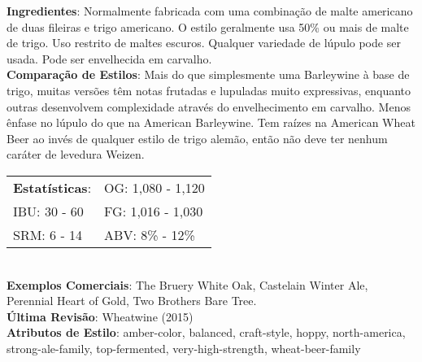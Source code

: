 \textbf{Ingredientes}: Normalmente fabricada com uma combinação de malte americano de duas fileiras e trigo americano. O estilo geralmente usa 50\% ou mais de malte de trigo. Uso restrito de maltes escuros. Qualquer variedade de lúpulo pode ser usada. Pode ser envelhecida em carvalho. \\
\textbf{Comparação de Estilos}: Mais do que simplesmente uma Barleywine à base de trigo, muitas versões têm notas frutadas e lupuladas muito expressivas, enquanto outras desenvolvem complexidade através do envelhecimento em carvalho. Menos ênfase no lúpulo do que na American Barleywine. Tem raízes na American Wheat Beer ao invés de qualquer estilo de trigo alemão, então não deve ter nenhum caráter de levedura Weizen. \\
\begin{tabular}{@{}p{35mm}p{35mm}@{}}
  \textbf{Estatísticas}: & OG: 1,080 - 1,120 \\
  IBU: 30 - 60 & FG: 1,016 - 1,030 \\
  SRM: 6 - 14 & ABV: 8\% - 12\%
\end{tabular}\\
\textbf{Exemplos Comerciais}: The Bruery White Oak, Castelain Winter Ale, Perennial Heart of Gold, Two Brothers Bare Tree. \\
\textbf{Última Revisão}: Wheatwine (2015) \\
\textbf{Atributos de Estilo}: amber-color, balanced, craft-style, hoppy, north-america, strong-ale-family, top-fermented, very-high-strength, wheat-beer-family
